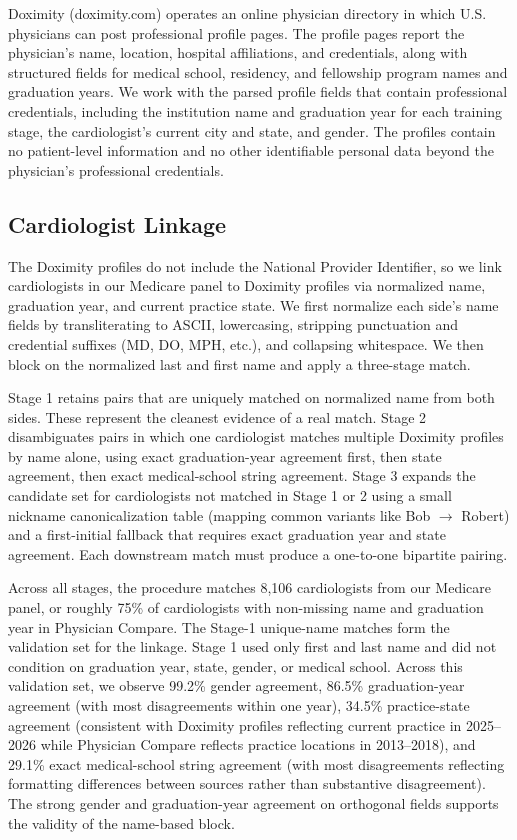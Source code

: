 \documentclass[12pt]{article}
\begin{document}
Doximity (doximity.com) operates an online physician directory in which U.S. physicians can post professional profile pages. The profile pages report the physician's name, location, hospital affiliations, and credentials, along with structured fields for medical school, residency, and fellowship program names and graduation years. We work with the parsed profile fields that contain professional credentials, including the institution name and graduation year for each training stage, the cardiologist's current city and state, and gender. The profiles contain no patient-level information and no other identifiable personal data beyond the physician's professional credentials.

\subsection{Cardiologist Linkage}

The Doximity profiles do not include the National Provider Identifier, so we link cardiologists in our Medicare panel to Doximity profiles via normalized name, graduation year, and current practice state. We first normalize each side's name fields by transliterating to ASCII, lowercasing, stripping punctuation and credential suffixes (MD, DO, MPH, etc.), and collapsing whitespace. We then block on the normalized last and first name and apply a three-stage match.

Stage 1 retains pairs that are uniquely matched on normalized name from both sides. These represent the cleanest evidence of a real match. Stage 2 disambiguates pairs in which one cardiologist matches multiple Doximity profiles by name alone, using exact graduation-year agreement first, then state agreement, then exact medical-school string agreement. Stage 3 expands the candidate set for cardiologists not matched in Stage 1 or 2 using a small nickname canonicalization table (mapping common variants like Bob $\rightarrow$ Robert) and a first-initial fallback that requires exact graduation year and state agreement. Each downstream match must produce a one-to-one bipartite pairing.

Across all stages, the procedure matches 8,106 cardiologists from our Medicare panel, or roughly 75\% of cardiologists with non-missing name and graduation year in Physician Compare. The Stage-1 unique-name matches form the validation set for the linkage. Stage 1 used only first and last name and did not condition on graduation year, state, gender, or medical school. Across this validation set, we observe 99.2\% gender agreement, 86.5\% graduation-year agreement (with most disagreements within one year), 34.5\% practice-state agreement (consistent with Doximity profiles reflecting current practice in 2025--2026 while Physician Compare reflects practice locations in 2013--2018), and 29.1\% exact medical-school string agreement (with most disagreements reflecting formatting differences between sources rather than substantive disagreement). The strong gender and graduation-year agreement on orthogonal fields supports the validity of the name-based block.
\end{document}

